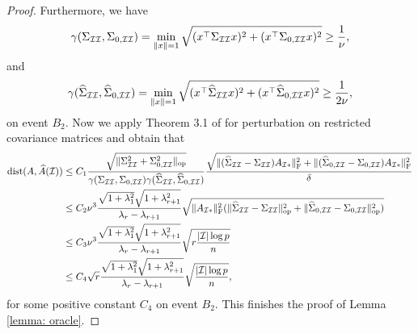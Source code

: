 \documentclass[11pt]{article}
\newcommand{\nb}[1]{\textcolor{orange}{\texttt{[#1]}}}
\newcommand{\rev}[1]{\textcolor{black}{#1}}
\newcommand{\ha}{\widehat{A}}
\newcommand{\dist}{\mathrm{dist}}
\newcommand{\cI}{{\mathcal{I}}}
\newcommand{\0}{{\mathbf{0}}}
\newcommand{\op}{{\mathrm{op}}}
\begin{document}
\begin{proof}
\par Furthermore, we have\begin{equation*}
\gamma(\Sigma_{\cI\cI},\Sigma_{0,\cI\cI})=\min_{\|x\|=1}\sqrt{(x^\top\Sigma_{\cI\cI} x)^2+(x^\top\Sigma_{0,\cI\cI} x)^2}\geq \frac{1}{\rev{\nu}},
\end{equation*}
and \begin{equation*}
\gamma(\widehat{\Sigma}_{\cI\cI},\widehat{\Sigma}_{0,\cI\cI})=\min_{\|x\|=1}\sqrt{(x^\top\widehat{\Sigma}_{\cI\cI} x)^2+(x^\top\widehat{\Sigma}_{0,\cI\cI} x)^2}\geq \frac{1}{2\rev{\nu}},
\end{equation*}
on event $B_2$. 
Now we apply Theorem 3.1 of \cite{sun1983perturbation} for perturbation on restricted covariance matrices and obtain that 
\begin{align*}
\dist(A,\ha(\cI))&\leq C_1\frac{\sqrt{\|\Sigma_{\cI\cI}^2+\Sigma_{0,\cI\cI}^2\|_\op}}{\gamma(\Sigma_{\cI\cI},\Sigma_{0,\cI\cI})\gamma(\widehat{\Sigma}_{\cI\cI},\widehat{\Sigma}_{0,\cI\cI})}\frac{\sqrt{\|(\widehat{\Sigma}_{\cI\cI}-\Sigma_{\cI\cI})A_{\cI*}\|_\mathrm{F}^2+\|(\widehat{\Sigma}_{0,\cI\cI}-\Sigma_{0,\cI\cI})A_{\cI*}\|_\mathrm{F}^2}}{\delta}\\
&\leq C_2 \rev{\nu^3}\frac{\sqrt{1+\lambda_1^2}\sqrt{{1+\lambda_{r+1}^2}}}{\lambda_r-\lambda_{r+1}}\sqrt{\|A_{\cI*}\|_\mathrm{F}^2(\|\widehat{\Sigma}_{\cI\cI}-\Sigma_{\cI\cI}\|_\op^2+\|\widehat{\Sigma}_{0,\cI\cI}-\Sigma_{0,\cI\cI}\|_\op^2)}\\
&\leq C_3 \rev{\nu^3}\frac{\sqrt{1+\lambda_1^2}\sqrt{{1+\lambda_{r+1}^2}}}{\lambda_r-\lambda_{r+1}}\sqrt{r\frac{|\cI|\log p}{n}}\\
&\leq C_4 \sqrt{r}\frac{\sqrt{1+\lambda_1^2}\sqrt{{1+\lambda_{r+1}^2}}}{\lambda_r-\lambda_{r+1}}\sqrt{\frac{|\cI|\log p}{n}},
\end{align*}
for some positive constant $C_4$ 
on event $B_2$. 
This finishes the proof of Lemma \ref{lemma: oracle}. 
\end{proof}
\end{document}
